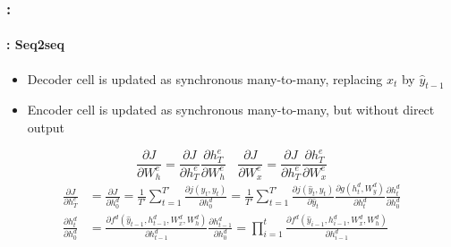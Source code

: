 \documentclass[xcolor=table]{beamer}
\begin{document}
\begin{frame}
	\frametitle{\insertshortsubtitle: \insertsection}
	\framesubtitle{\insertsubsection: Seq2seq}
	
	\begin{itemize}
		\item Decoder cell is updated as synchronous many-to-many, replacing $x_t$ by $\hat{y}_{t-1}$
		\item Encoder cell is updated as synchronous many-to-many, but without direct output
	\end{itemize}
	
	\[\frac{\partial J}{\partial W^e_h} = \frac{\partial J}{\partial h^e_T} \frac{\partial h^e_T}{\partial W^e_h} 
	\ \ \ \
	\frac{\partial J}{\partial W^e_x}  = \frac{\partial J}{\partial h^e_T} \frac{\partial h^e_T}{\partial W^e_x} 
	\]
	\begin{align*}
		\frac{\partial J}{\partial h^e_T} & = \frac{\partial J}{\partial h^d_0}
		= \frac{1}{T'} \sum_{t=1}^{T'} \frac{\partial j(\hat{y}_t, y_t)}{\partial h^d_0} 
		= \frac{1}{T'} \sum_{t=1}^{T'} 
		\frac{\partial j(\hat{y}_t, y_t)}{\partial \hat{y}_t} 
		\frac{\partial g(h^d_t, W^d_y)}{\partial h^d_t} 
		\frac{\partial h^d_t}{\partial h^d_0}\\
		\frac{\partial h^d_t}{\partial h^d_0} & = 
		\frac{\partial f^d(\hat{y}_{t-1}, h^d_{t-1}, W^d_x, W^d_h)}{\partial h^d_{t-1}} \frac{\partial h^d_{t-1}}{\partial h^d_{0}} 
		= \prod_{i=1}^{t} \frac{\partial f^d(\hat{y}_{i-1}, h^d_{i-1}, W^d_x, W^d_h)}{\partial h^d_{i-1}}\\
	\end{align*}
	
\end{frame}
\end{document}
